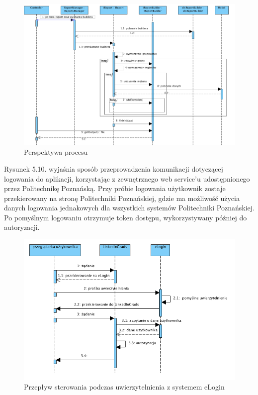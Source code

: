 \begin{figure}[H] 
\centering\includegraphics[width=15cm]{figures/image10}
\caption{Perspektywa procesu}\label{rys:use-case-diagram}
\end{figure}

Rysunek 5.10. wyjaśnia sposób przeprowadzenia komunikacji dotyczącej logowania do aplikacji, korzystając z zewnętrznego web service’u udostępnionego przez Politechnikę Poznańską. Przy próbie logowania użytkownik zostaje przekierowany na stronę Politechniki Poznańskiej, gdzie ma możliwość użycia danych logowania jednakowych dla wszystkich systemów Politechniki Poznańskiej. Po pomyślnym logowaniu otrzymuje token dostępu, wykorzystywany później do autoryzacji.

\begin{figure}[H] 
\centering\includegraphics[width=15cm]{figures/image11}
\caption{Przepływ sterowania podczas uwierzytelnienia z systemem eLogin}\label{rys:use-case-diagram}
\end{figure}


